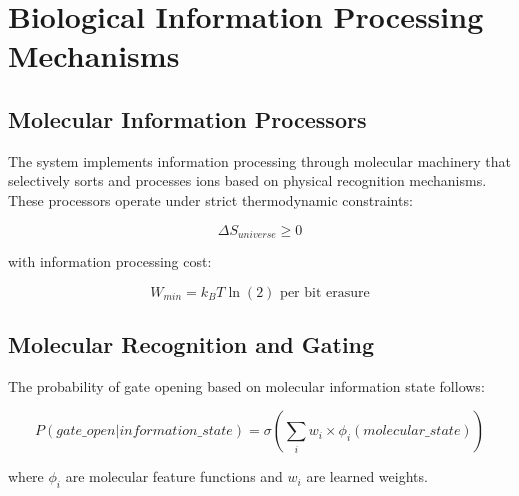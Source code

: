 \documentclass[12pt,a4paper]{article}
\begin{document}
\section{Biological Information Processing Mechanisms}

\subsection{Molecular Information Processors}

The system implements information processing through molecular machinery that selectively sorts and processes ions based on physical recognition mechanisms. These processors operate under strict thermodynamic constraints:

\begin{equation}
\Delta S_{universe} \geq 0
\label{eq:entropy_constraint}
\end{equation}

with information processing cost:

\begin{equation}
W_{min} = k_B T \ln(2) \text{ per bit erasure}
\label{eq:landauer_limit}
\end{equation}

\subsection{Molecular Recognition and Gating}

The probability of gate opening based on molecular information state follows:

\begin{equation}
P(gate\_open | information\_state) = \sigma\left(\sum_i w_i \times \phi_i(molecular\_state)\right)
\label{eq:gate_prob}
\end{equation}

where $\phi_i$ are molecular feature functions and $w_i$ are learned weights.
\end{document}
